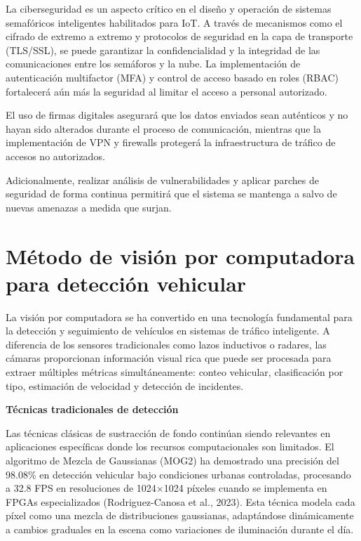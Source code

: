 \documentclass[12pt,a4paper,oneside]{report}
\begin{document}
La ciberseguridad es un aspecto crítico en el diseño y operación de sistemas semafóricos inteligentes habilitados para IoT. A través de mecanismos como el cifrado de extremo a extremo y protocolos de seguridad en la capa de transporte (TLS/SSL), se puede garantizar la confidencialidad y la integridad de las comunicaciones entre los semáforos y la nube. La implementación de autenticación multifactor (MFA) y control de acceso basado en roles (RBAC) fortalecerá aún más la seguridad al limitar el acceso a personal autorizado.

El uso de firmas digitales asegurará que los datos enviados sean auténticos y no hayan sido alterados durante el proceso de comunicación, mientras que la implementación de VPN y firewalls protegerá la infraestructura de tráfico de accesos no autorizados.

Adicionalmente, realizar análisis de vulnerabilidades y aplicar parches de seguridad de forma continua permitirá que el sistema se mantenga a salvo de nuevas amenazas a medida que surjan.

\section{Método de visión por computadora para detección vehicular}\label{muxe9todo-de-visiuxf3n-por-computadora-para-detecciuxf3n-vehicular}

La visión por computadora se ha convertido en una tecnología fundamental para la detección y seguimiento de vehículos en sistemas de tráfico inteligente. A diferencia de los sensores tradicionales como lazos inductivos o radares, las cámaras proporcionan información visual rica que puede ser procesada para extraer múltiples métricas simultáneamente: conteo vehicular, clasificación por tipo, estimación de velocidad y detección de incidentes.

\textbf{Técnicas tradicionales de detección}

Las técnicas clásicas de sustracción de fondo continúan siendo relevantes en aplicaciones específicas donde los recursos computacionales son limitados. El algoritmo de Mezcla de Gaussianas (MOG2) ha demostrado una precisión del 98.08\% en detección vehicular bajo condiciones urbanas controladas, procesando a 32.8 FPS en resoluciones de 1024\ensuremath{\times}1024 píxeles cuando se implementa en FPGAs especializados (Rodriguez-Canosa et al., 2023). Esta técnica modela cada píxel como una mezcla de distribuciones gaussianas, adaptándose dinámicamente a cambios graduales en la escena como variaciones de iluminación durante el día.
\end{document}
